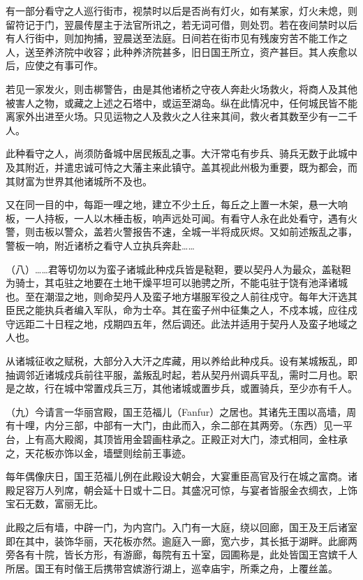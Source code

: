 \documentclass[12pt,UTF8]{ctexbook}
\begin{document}
有一部分看守之人巡行街市，视禁时以后是否尚有灯火，如有某家，灯火未熄，则留符记于门，翌晨传屋主于法官所讯之，若无词可借，则处罚。若在夜间禁时以后有人行街中，则加拘捕，翌晨送至法庭。日间若在街市见有残废穷苦不能工作之人，送至养济院中收容；此种养济院甚多，旧日国王所立，资产甚巨。其人疾愈以后，应使之有事可作。

若见一家发火，则击梆警告，由是其他诸桥之守夜人奔赴火场救火，将商人及其他被害人之物，或藏之上述之石塔中，或运至湖岛。纵在此情况中，任何城民皆不能离家外出进至火场。只见运物之人及救火之人往来其间，救火者其数至少有一二千人。

此种看守之人，尚须防备城中居民叛乱之事。大汗常屯有步兵、骑兵无数于此城中及其附近，并遣忠诚可恃之大藩主来此镇守。盖其视此州极为重要，既为都会，而其财富为世界其他诸城所不及也。

又在同一目的中，每距一哩之地，建立不少土丘，每丘之上置一木架，悬一大响板，一人持板，一人以木棰击板，响声远处可闻。有看守人永在此处看守，遇有火警，则击板以警众，盖若火警报告不速，全城一半将成灰烬。又如前述叛乱之事，警板一响，附近诸桥之看守人立执兵奔赴……

（八）……君等切勿以为蛮子诸城此种戍兵皆是鞑靼，要以契丹人为最众，盖鞑靼为骑士，其屯驻之地要在土地干燥平坦可以驰骋之所，不能屯驻于饶有池泽诸城也。至在潮湿之地，则命契丹人及蛮子地方堪服军役之人前往戍守。每年大汗选其臣民之能执兵者编入军队，命为士卒。其在蛮子州中征集之人，不戍本城，应往戍守远距二十日程之地，戍期四五年，然后调还。此法并适用于契丹人及蛮子地域之人也。

从诸城征收之赋税，大部分入大汗之库藏，用以养给此种戍兵。设有某城叛乱，即抽调邻近诸城戍兵前往平服，盖叛乱时起，若从契丹州调兵平乱，需时二月也。职是之故，行在城中常置戍兵三万，其他诸城或置步兵，或置骑兵，至少亦有千人。

（九）今请言一华丽宫殿，国王范福儿（Fanfur）之居也。其诸先王围以高墙，周有十哩，内分三部，中部有一大门，由此而入，余二部在其两旁。（东西）见一平台，上有高大殿阁，其顶皆用金碧画柱承之。正殿正对大门，漆式相同，金柱承之，天花板亦饰以金，墙壁则绘前王事迹。

每年偶像庆日，国王范福儿例在此殿设大朝会，大宴重臣高官及行在城之富商。诸殿足容万人列席，朝会延十日或十二日。其盛况可惊，与宴者皆服金衣绸衣，上饰宝石无数，富丽无比。

此殿之后有墙，中辟一门，为内宫门。入门有一大庭，绕以回廊，国王及王后诸室即在其中，装饰华丽，天花板亦然。逾庭入一廊，宽六步，其长抵于湖畔。此廊两旁各有十院，皆长方形，有游廊，每院有五十室，园圃称是，此处皆国王宫嫔千人所居。国王有时偕王后携带宫嫔游行湖上，巡幸庙宇，所乘之舟，上覆丝盖。
\end{document}
